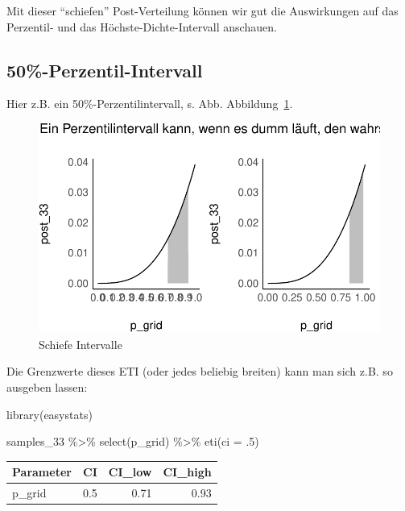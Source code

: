 \documentclass[
  a4paper,
  DIV=11]{scrreprt}
\newenvironment{Shaded}{\begin{snugshade}}{\end{snugshade}}
\newcommand{\AttributeTok}[1]{\textcolor[rgb]{0.40,0.45,0.13}{#1}}
\newcommand{\DecValTok}[1]{\textcolor[rgb]{0.68,0.00,0.00}{#1}}
\newcommand{\FunctionTok}[1]{\textcolor[rgb]{0.28,0.35,0.67}{#1}}
\newcommand{\NormalTok}[1]{\textcolor[rgb]{0.00,0.23,0.31}{#1}}
\newcommand{\SpecialCharTok}[1]{\textcolor[rgb]{0.37,0.37,0.37}{#1}}
\theoremstyle{definition}
\theoremstyle{remark}
\begin{document}
Mit dieser ``schiefen'' Post-Verteilung können wir gut die Auswirkungen
auf das Perzentil- und das Höchste-Dichte-Intervall anschauen.

\hypertarget{perzentil-intervall}{%
\subsection{50\%-Perzentil-Intervall}\label{perzentil-intervall}}

Hier z.B. ein 50\%-Perzentilintervall, s. Abb.
Abbildung~\ref{fig-schief}.

\begin{figure}

{\centering \includegraphics{./Post_files/figure-pdf/fig-schief-1.pdf}

}

\caption{\label{fig-schief}Schiefe Intervalle}

\end{figure}

Die Grenzwerte dieses ETI (oder jedes beliebig breiten) kann man sich
z.B. so ausgeben lassen:

\begin{Shaded}
\begin{Highlighting}[]
\FunctionTok{library}\NormalTok{(easystats)}

\NormalTok{samples\_33 }\SpecialCharTok{\%\textgreater{}\%} 
  \FunctionTok{select}\NormalTok{(p\_grid) }\SpecialCharTok{\%\textgreater{}\%} 
  \FunctionTok{eti}\NormalTok{(}\AttributeTok{ci =}\NormalTok{ .}\DecValTok{5}\NormalTok{)}
\end{Highlighting}
\end{Shaded}

\begin{longtable}[]{@{}lrrr@{}}
\toprule()
Parameter & CI & CI\_low & CI\_high \\
\midrule()
\endhead
p\_grid & 0.5 & 0.71 & 0.93 \\
\bottomrule()
\end{longtable}
\end{document}
